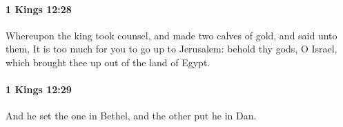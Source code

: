 		\paragraph{1 Kings 12:28} %
			\label{1KINGS-12-28}

			Whereupon the king took counsel, and made two calves of gold, and said unto them, It is too much for you to go up to Jerusalem: behold thy gods, O Israel, which brought thee up out of the land of Egypt.


		\paragraph{1 Kings 12:29} %
			\label{1KINGS-12-29}

			And he set the one in Bethel, and the other put he in Dan.


